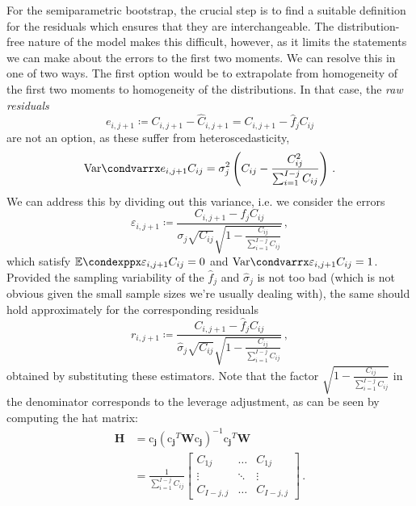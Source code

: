\documentclass[a4paper]{book}
\begin{document}
For the semiparametric bootstrap, the crucial step is to find a suitable definition for the residuals which ensures that they are interchangeable. The distribution-free nature of the model makes this difficult, however, as it limits the statements we can make about the errors to the first two moments. We can resolve this in one of two ways. The first option would be to extrapolate from homogeneity of the first two moments to homogeneity of the distributions. In that case, the \emph{raw residuals}
\begin{equation}
  e_{i, j + 1} \coloneqq C_{i, j + 1} - \widehat{C}_{i, j + 1} = C_{i, j + 1} - \widehat{f}_j C_{ij}
\end{equation}
are not an option, as these suffer from heteroscedasticity,
\begin{equation}
  \condvarr{e_{i, j + 1}}{C_{ij}} = \sigma^2_j \left( C_{ij} - \frac{C^2_{ij}}{\sum_{i = 1}^{I - j} C_{ij}} \right) \,.
\end{equation}
We can address this by dividing out this variance, i.e. we consider the errors
\begin{equation}
  \varepsilon_{i, j + 1} \coloneqq \frac{C_{i, j + 1} - f_j C_{ij}}{\sigma_j \sqrt{C_{ij}} \sqrt{1 - \frac{C_{ij}}{\sum_{i = 1}^{I - j} C_{ij}}}} \,,
\end{equation}
which satisfy $\condexpp{\varepsilon_{i, j + 1}}{C_{ij}} = 0$ and $\condvarr{\varepsilon_{i, j + 1}}{C_{ij}} = 1$. Provided the sampling variability of the $\widehat{f}_j$ and $\widehat{\sigma}_j$ is not too bad (which is not obvious given the small sample sizes we're usually dealing with), the same should hold approximately for the corresponding residuals
\begin{equation}
  r_{i, j + 1} \coloneqq \frac{C_{i, j + 1} - \widehat{f}_j C_{ij}}{\widehat{\sigma}_j \sqrt{C_{ij}} \sqrt{1 - \frac{C_{ij}}{\sum_{i = 1}^{I - j} C_{ij}}}} \,,
\end{equation}
obtained by substituting these estimators. Note that the factor $\sqrt{1 - \frac{C_{ij}}{\sum_{i = 1}^{I - j} C_{ij}}}$ in the denominator corresponds to the leverage adjustment, as can be seen by computing the hat matrix:
\begin{align}
  \mathbf{H} & = \bm{\mathrm{c}_j} (\bm{\mathrm{c}_j}^T \mathbf{W} \bm{\mathrm{c}_j})^{-1} \bm{\mathrm{c}_j}^T \mathbf{W} \\[4pt]
             & = \frac{1}{\sum_{i = 1}^{I - j} C_{ij}}
  \begin{bmatrix}
    C_{1j}       & \dots  & C_{1j}       \\
    \vdots       & \ddots & \vdots       \\
    C_{I - j, j} & \dots  & C_{I - j, j}
  \end{bmatrix} \,.
\end{align}
\end{document}
